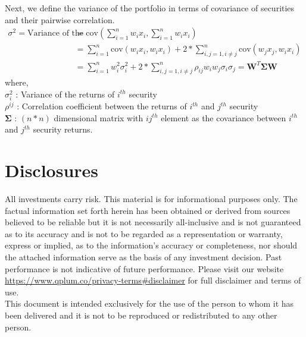 \documentclass[a4paper]{article}
\begin{document}
Next, we define the variance of the portfolio in terms of covariance of securities and their pairwise correlation.
\begin{align*}
\sigma^2 = \text{Variance of the returns of the portfolio} 
&= \text{cov}(\sum_{i=1}^n w_ix_i, \sum_{i=1}^n w_ix_i ) \\
&= \sum_{i=1}^n \text{cov}(w_ix_i,w_ix_i) + 2 * \sum_{i,j=1,i\neq j }^n \text{cov}(w_jx_j,w_ix_i) \\
&= \sum_{i=1}^n w_i^2\sigma_i^2 + 2 *\sum_{i,j=1,i\neq j }^n \rho_{ij}w_iw_j\sigma_i\sigma_j = \mathbf{W}^T\mathbf{\Sigma W }
\end{align*}
where,\\
 $\sigma^2_i$ : Variance of the returns of $i^{th}$ security \\
$\rho^{ij}$ : Correlation coefficient between the returns of $i^{th}$ and $j^{th}$ security \\
$\mathbf{\Sigma}$ : $(n * n)$ dimensional matrix with $ij^{th}$ element as the covariance between $i^{th}$ and $j^{th}$ security returns.




\newpage
\section{Disclosures \label{disclosures} }
All investments carry risk. This material is for informational purposes only. The factual information set forth herein has been obtained or derived from sources believed to be reliable but it is not necessarily all-inclusive and is not guaranteed as to its accuracy and is not to be regarded as a representation or warranty, express or implied, as to the information’s accuracy or completeness, nor should the attached information serve as the basis of any investment decision. Past performance is not indicative of future performance. Please visit our website \url{https://www.qplum.co/privacy-terms#disclaimer} for full disclaimer and terms of use.\\
This document is intended exclusively for the use of the person to whom it has been delivered and it is not to be reproduced or redistributed to any other person.
\end{document}
